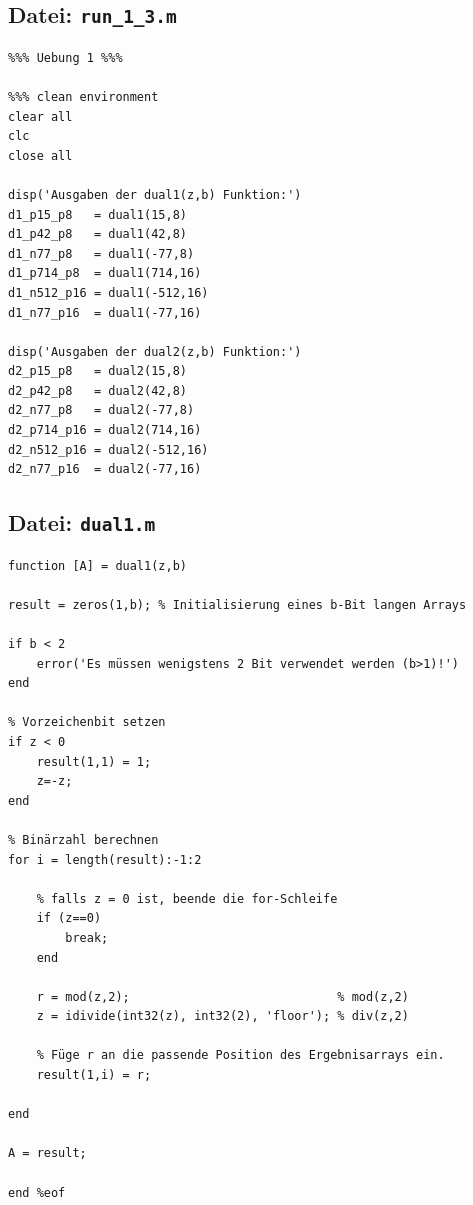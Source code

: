 \documentclass{llncs}
\begin{document}
\subsection*{Datei: \texttt{run\_1\_3.m}}
\begin{verbatim}
%%% Uebung 1 %%%

%%% clean environment
clear all
clc
close all

disp('Ausgaben der dual1(z,b) Funktion:')
d1_p15_p8   = dual1(15,8)
d1_p42_p8   = dual1(42,8)
d1_n77_p8   = dual1(-77,8)
d1_p714_p8  = dual1(714,16)
d1_n512_p16 = dual1(-512,16)
d1_n77_p16  = dual1(-77,16)

disp('Ausgaben der dual2(z,b) Funktion:')
d2_p15_p8   = dual2(15,8)
d2_p42_p8   = dual2(42,8)
d2_n77_p8   = dual2(-77,8)
d2_p714_p16 = dual2(714,16)
d2_n512_p16 = dual2(-512,16)
d2_n77_p16  = dual2(-77,16)
\end{verbatim}
\newpage
\subsection*{Datei: \texttt{dual1.m}}
\begin{verbatim}
function [A] = dual1(z,b)

result = zeros(1,b); % Initialisierung eines b-Bit langen Arrays

if b < 2
    error('Es müssen wenigstens 2 Bit verwendet werden (b>1)!')
end

% Vorzeichenbit setzen
if z < 0
    result(1,1) = 1;
    z=-z;
end

% Binärzahl berechnen
for i = length(result):-1:2

    % falls z = 0 ist, beende die for-Schleife
    if (z==0)
        break;
    end
    
    r = mod(z,2);                             % mod(z,2)
    z = idivide(int32(z), int32(2), 'floor'); % div(z,2)
    
    % Füge r an die passende Position des Ergebnisarrays ein.
    result(1,i) = r; 
 
end

A = result;

end %eof
\end{verbatim}
\newpage
\end{document}
